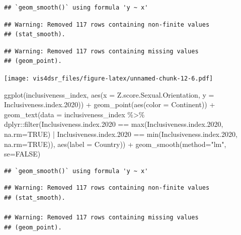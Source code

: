 \documentclass[
]{krantz}
\makeatletter
\newenvironment{Shaded}{\begin{snugshade}}{\end{snugshade}}
\newcommand{\AttributeTok}[1]{\textcolor[rgb]{0.61,0.61,0.61}{#1}}
\newcommand{\ConstantTok}[1]{\textcolor[rgb]{0,0,0}{#1}}
\newcommand{\FloatTok}[1]{\textcolor[rgb]{0.06,0.06,0.06}{#1}}
\newcommand{\FunctionTok}[1]{\textcolor[rgb]{0,0,0}{#1}}
\newcommand{\NormalTok}[1]{#1}
\newcommand{\SpecialCharTok}[1]{\textcolor[rgb]{0,0,0}{#1}}
\newcommand{\StringTok}[1]{\textcolor[rgb]{0.5,0.5,0.5}{#1}}
\newenvironment{kframe}{%
\medskip{}
\setlength{\fboxsep}{.8em}
 \def\at@end@of@kframe{}%
 \ifinner\ifhmode%
  \def\at@end@of@kframe{\end{minipage}}%
  \begin{minipage}{\columnwidth}%
 \fi\fi%
 \def\FrameCommand##1{\hskip\@totalleftmargin \hskip-\fboxsep
 \colorbox{shadecolor}{##1}\hskip-\fboxsep
     \hskip-\linewidth \hskip-\@totalleftmargin \hskip\columnwidth}%
 \MakeFramed {\advance\hsize-\width
   \@totalleftmargin\z@ \linewidth\hsize
   \@setminipage}}%
 {\par\unskip\endMakeFramed%
 \at@end@of@kframe}
\renewenvironment{Shaded}{\begin{kframe}}{\end{kframe}}
\makeatother
\begin{document}
\begin{verbatim}
## `geom_smooth()` using formula 'y ~ x'
\end{verbatim}

\begin{verbatim}
## Warning: Removed 117 rows containing non-finite values
## (stat_smooth).
\end{verbatim}

\begin{verbatim}
## Warning: Removed 117 rows containing missing values
## (geom_point).
\end{verbatim}

\texttt{[image: vis4dsr\_files/figure-latex/unnamed-chunk-12-6.pdf]}

\begin{Shaded}
\begin{Highlighting}[]
\FunctionTok{ggplot}\NormalTok{(inclusiveness\_index, }
       \FunctionTok{aes}\NormalTok{(}\AttributeTok{x =}\NormalTok{ Z.score.Sexual.Orientation, }
           \AttributeTok{y =}\NormalTok{ Inclusiveness.index}\FloatTok{.2020}\NormalTok{)) }\SpecialCharTok{+}
  \FunctionTok{geom\_point}\NormalTok{(}\FunctionTok{aes}\NormalTok{(}\AttributeTok{color =}\NormalTok{ Continent)) }\SpecialCharTok{+}
  \FunctionTok{geom\_text}\NormalTok{(}\AttributeTok{data =}\NormalTok{ inclusiveness\_index }\SpecialCharTok{\%\textgreater{}\%} 
\NormalTok{              dplyr}\SpecialCharTok{::}\FunctionTok{filter}\NormalTok{(Inclusiveness.index}\FloatTok{.2020} \SpecialCharTok{==} \FunctionTok{max}\NormalTok{(Inclusiveness.index}\FloatTok{.2020}\NormalTok{, }\AttributeTok{na.rm=}\ConstantTok{TRUE}\NormalTok{) }\SpecialCharTok{|}\NormalTok{ Inclusiveness.index}\FloatTok{.2020} \SpecialCharTok{==} \FunctionTok{min}\NormalTok{(Inclusiveness.index}\FloatTok{.2020}\NormalTok{, }\AttributeTok{na.rm=}\ConstantTok{TRUE}\NormalTok{)), }\FunctionTok{aes}\NormalTok{(}\AttributeTok{label =}\NormalTok{ Country)) }\SpecialCharTok{+}
  \FunctionTok{geom\_smooth}\NormalTok{(}\AttributeTok{method=}\StringTok{"lm"}\NormalTok{, }\AttributeTok{se=}\ConstantTok{FALSE}\NormalTok{)}
\end{Highlighting}
\end{Shaded}

\begin{verbatim}
## `geom_smooth()` using formula 'y ~ x'
\end{verbatim}

\begin{verbatim}
## Warning: Removed 117 rows containing non-finite values
## (stat_smooth).

## Warning: Removed 117 rows containing missing values
## (geom_point).
\end{verbatim}
\end{document}
